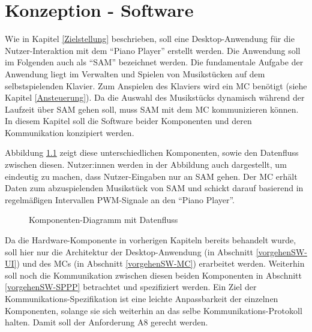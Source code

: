 
\chapter{Konzeption - Software} \label{vorgehenSW}

Wie in Kapitel \ref{Zielstellung} beschrieben, soll eine Desktop-Anwendung für die Nutzer-Interaktion mit dem \enquote{Piano Player} erstellt werden.
Die Anwendung soll im Folgenden auch als \enquote{\acf{SAM}} bezeichnet werden.
Die fundamentale Aufgabe der Anwendung liegt im Verwalten und Spielen von Musikstücken auf dem selbstspielenden Klavier.
Zum Anspielen des Klaviers wird ein \ac{MC} benötigt (siehe Kapitel \ref{Ansteuerung}).
Da die Auswahl des Musikstücks dynamisch während der Laufzeit über \ac{SAM} gehen soll, muss \ac{SAM} mit dem \ac{MC} kommunizieren können.
In diesem Kapitel soll die Software beider Komponenten und deren Kommunikation konzipiert werden.

Abbildung \ref*{fig:high-level-komponenten} zeigt diese unterschiedlichen Komponenten, sowie den Datenfluss zwischen diesen.
Nutzer:innen werden in der Abbildung auch dargestellt, um eindeutig zu machen, dass Nutzer-Eingaben nur an \ac{SAM} gehen.
Der \ac{MC} erhält Daten zum abzuspielenden Musikstück von \ac{SAM} und schickt darauf basierend in regelmäßigen Intervallen \ac{PWM}-Signale an den \enquote{Piano Player}.

\begin{figure}[htbp]
    \centering
    \caption{Komponenten-Diagramm mit Datenfluss}
    \label{fig:high-level-komponenten}
\end{figure}

Da die Hardware-Komponente in vorherigen Kapiteln bereits behandelt wurde, soll hier nur die Architektur der Desktop-Anwendung (in Abschnitt \ref{vorgehenSW-UI}) und des \ac{MC}s (in Abschnitt \ref{vorgehenSW-MC}) erarbeitet werden.
Weiterhin soll noch die Kommunikation zwischen diesen beiden Komponenten in Abschnitt \ref{vorgehenSW-SPPP} betrachtet und spezifiziert werden.
Ein Ziel der Kommunikations-Spezifikation ist eine leichte Anpassbarkeit der einzelnen Komponenten, solange sie sich weiterhin an das selbe Kommunikations-Protokoll halten.
Damit soll der Anforderung A8 gerecht werden.

